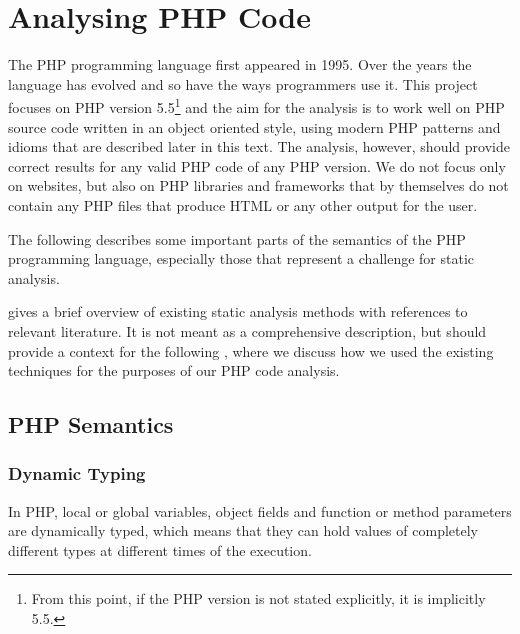 
\chapter{Analysing PHP Code}

    The PHP programming language first appeared in 1995\cite{phphist}. Over the years 
    the language has evolved and so have the ways programmers use it. 
    This project focuses on PHP version 5.5\footnote{From this point, 
    if the PHP version is not stated explicitly, it is implicitly 5.5.} 
    and the aim for the analysis 
    is to work well on PHP source code written in an object oriented style, 
    using modern PHP patterns and idioms that are described later in 
    this text. The analysis, however, should provide correct results for 
    any valid PHP code of any PHP version. We do not focus only on websites, but also on 
    PHP libraries and frameworks that by themselves do not contain 
    any PHP files that produce HTML or any other output for the user.
    
    The following \wsection{}  describes some important parts 
    of the semantics of the PHP programming language, especially those 
    that represent a challenge for static analysis.

    \wSection{}  gives a brief overview of existing 
    static analysis methods with references to relevant literature. 
    It is  not meant as a comprehensive description, but should provide a 
    context for the following \wsection{} , 
    where we discuss how we used the existing techniques for the purposes 
    of our PHP code analysis.
    
    \section{PHP Semantics}
    \label{phpsem}

    \subsection{Dynamic Typing}
    In PHP, local or global variables, object fields and function or 
    method parameters are dynamically typed, which means that they 
    can hold values of completely different types at different 
    times of the execution.
    
